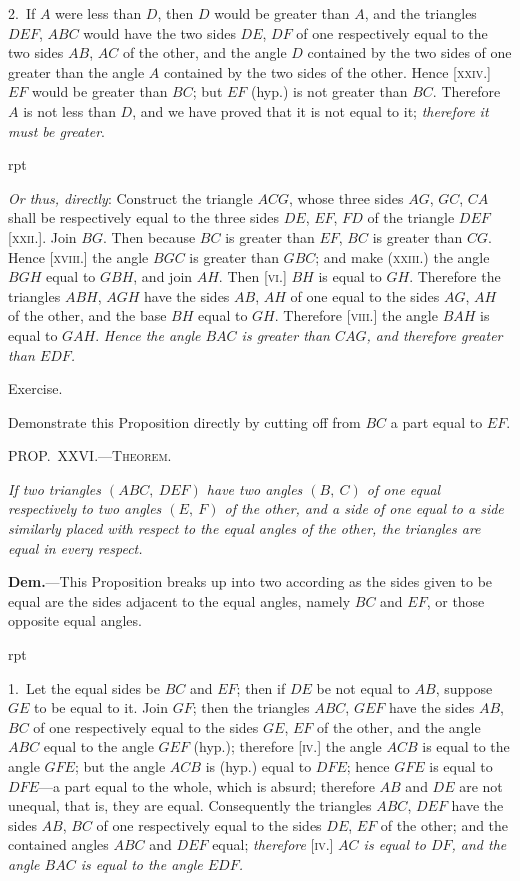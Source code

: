 \documentclass[oneside]{book}
\newcommand\mypropl[2]{
\bigskip\Needspace*{4\baselineskip}\begin{center}\textsc{#1}\end{center}
\hspace{\parindent}\emph{#2}\par\medskip
}
\newcommand\exhead[1]{
\Needspace*{5\baselineskip}\begin{center}
\textsf{#1}
\end{center}
}
\newcommand\imgflow[3]{
\setcounter{wrapwidth}{#1}
\begin{wrapfigure}[#2]{r}{\value{wrapwidth}pt}
\begin{center}
\vspace{-0.3in}
\end{center}
\end{wrapfigure}
}
\begin{document}
2.~If $A$ were less than $D$, then $D$ would be greater
than $A$, and the triangles $DEF$, $ABC$ would have the two
sides $DE$, $DF$ of one respectively equal to the two sides
$AB$, $AC$ of the other, and the angle $D$ contained by the
two sides of one greater than the angle $A$ contained by
the two sides of the other. Hence [\textsc{xxiv}.] $EF$ would be
greater than $BC$; but $EF$ (hyp.) is not greater than $BC$.
Therefore $A$ is not less than $D$, and we have proved
that it is not equal to it; \emph{therefore it must be greater}.

\imgflow{190}{10}{f043}

\emph{Or thus, directly}: Construct the triangle $ACG$, whose
three sides $AG$, $GC$, $CA$ shall be respectively equal to
the three sides $DE$, $EF$, $FD$ of the triangle $DEF$ [\textsc{xxii}.].
Join $BG$. Then because $BC$ is greater than $EF$, $BC$ is
greater than $CG$. Hence [\textsc{xviii}.] the angle $BGC$ is
greater than $GBC$;
and make (\textsc{xxiii}.)
the angle $BGH$ equal
to $GBH$, and join
$AH$. Then [\textsc{vi}.] $BH$
is equal to $GH$.
Therefore the triangles
$ABH$, $AGH$
have the sides $AB$,
$AH$ of one equal to
the sides $AG$, $AH$ of the other, and the base $BH$ equal to
$GH$. Therefore [\textsc{viii}.] the angle $BAH$ is equal to $GAH$.
\emph{Hence the angle $BAC$ is greater than $CAG$, and therefore
greater than $EDF$.}

\exhead{Exercise.}

\begin{footnotesize}
Demonstrate this Proposition directly by cutting off from $BC$
a part equal to $EF$.
\par\end{footnotesize}


\mypropl{PROP\@.~XXVI\@.---Theorem.}{If two triangles $(ABC,\ DEF)$ have two angles $(B,\ C)$
of one equal respectively to two angles $(E,\ F)$ of the other,
and a side of one equal to a side similarly placed with
respect to the equal angles of the other, the triangles are
equal in every respect.}

\textbf{Dem.}---This Proposition breaks up into two according
as the sides given to be equal are the sides adjacent
to the equal angles, namely $BC$ and $EF$, or those
opposite equal angles.

\imgflow{140}{9}{f044}

1.~Let the equal sides be $BC$ and $EF$; then if $DE$ be
not equal to $AB$, suppose $GE$ to be equal to it. Join
$GF$; then the triangles $ABC$, $GEF$ have the sides $AB$,
$BC$ of one respectively equal to the sides $GE$, $EF$ of
the other, and the angle $ABC$ equal to the angle $GEF$
(hyp.); therefore [\textsc{iv}.] the angle $ACB$ is equal to the
angle $GFE$; but the angle
$ACB$ is (hyp.) equal to
$DFE$; hence $GFE$ is equal
to $DFE$---a part equal to
the whole, which is absurd;
therefore $AB$ and $DE$ are
not unequal, that is, they
are equal.  Consequently
the triangles $ABC$, $DEF$
have the sides $AB$, $BC$ of one respectively equal to the
sides $DE$, $EF$ of the other; and the contained angles
$ABC$ and $DEF$ equal; \emph{therefore} [\textsc{iv}.] \emph{$AC$ is equal to
$DF$, and the angle $BAC$ is equal to the angle $EDF$.}
\end{document}
